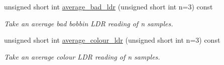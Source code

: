 \begin{DoxyCompactItemize}
unsigned short int \hyperlink{classIDP_1_1ClampControl_a3bb0dcc5ad18870b38a639ae30ae5466}{average\_\-bad\_\-ldr} (unsigned short int n=3) const 
\begin{DoxyCompactList}\small\item\em Take an average bad bobbin LDR reading of n samples. \item\end{DoxyCompactList}\item 
unsigned short int \hyperlink{classIDP_1_1ClampControl_abed3e9baa31872c8bd87521584f1e845}{average\_\-colour\_\-ldr} (unsigned short int n=3) const 
\begin{DoxyCompactList}\small\item\em Take an average colour LDR reading of n samples. \item\end{DoxyCompactList}\end{DoxyCompactItemize}
